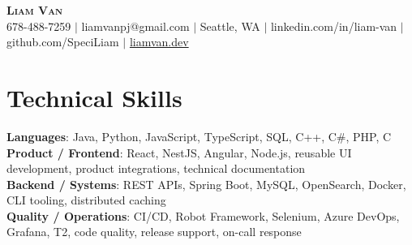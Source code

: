 \documentclass[letterpaper,11pt]{article}
\begin{document}

%
\begin{center}
    \textbf{\Huge \scshape Liam Van} \\ \vspace{1pt}
    \small 678-488-7259 $|$ \small {liamvanpj@gmail.com} $|$ Seattle, WA
 {{$|$ linkedin.com/in/liam-van} {$|$ github.com/SpeciLiam} {$|$ \href{https://liamvan.dev}{liamvan.dev}}}

\end{center}

\section{Technical Skills}
 \begin{itemize}[leftmargin=0.15in, label={}]
    \small{\item{
     \textbf{Languages}{: Java, Python, JavaScript, TypeScript, SQL, C++, C\#, PHP, C} \\
     \textbf{Product / Frontend}{: React, NestJS, Angular, Node.js, reusable UI development, product integrations, technical documentation} \\
     \textbf{Backend / Systems}{: REST APIs, Spring Boot, MySQL, OpenSearch, Docker, CLI tooling, distributed caching} \\
     \textbf{Quality / Operations}{: CI/CD, Robot Framework, Selenium, Azure DevOps, Grafana, T2, code quality, release support, on-call response} \\
    }}
 \end{itemize}
%
\end{document}
